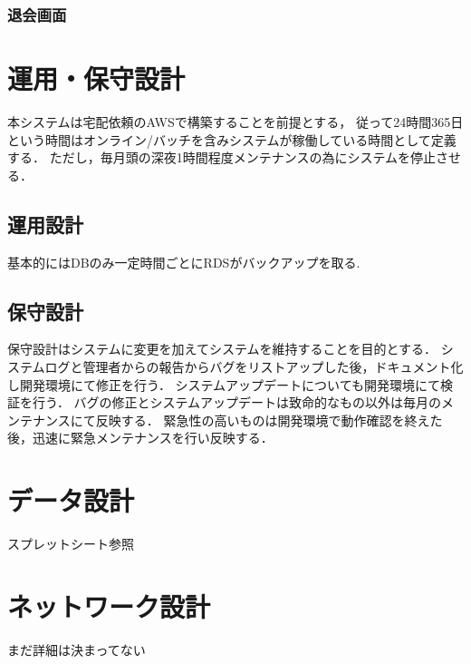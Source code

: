 \documentclass[a4paper, titlepage]{jsarticle}
\begin{document}
\subsubsection{退会画面}

\section{運用・保守設計}
本システムは宅配依頼のAWSで構築することを前提とする，
従って24時間365日という時間はオンライン/バッチを含みシステムが稼働している時間として定義する．
ただし，毎月頭の深夜1時間程度メンテナンスの為にシステムを停止させる．
\subsection{運用設計}
基本的にはDBのみ一定時間ごとにRDSがバックアップを取る.

\subsection{保守設計}
保守設計はシステムに変更を加えてシステムを維持することを目的とする．
システムログと管理者からの報告からバグをリストアップした後，ドキュメント化し開発環境にて修正を行う．
システムアップデートについても開発環境にて検証を行う．
バグの修正とシステムアップデートは致命的なもの以外は毎月のメンテナンスにて反映する．
緊急性の高いものは開発環境で動作確認を終えた後，迅速に緊急メンテナンスを行い反映する．
\section{データ設計}
スプレットシート参照
\section{ネットワーク設計}
まだ詳細は決まってない


% 
% 
\end{document}
